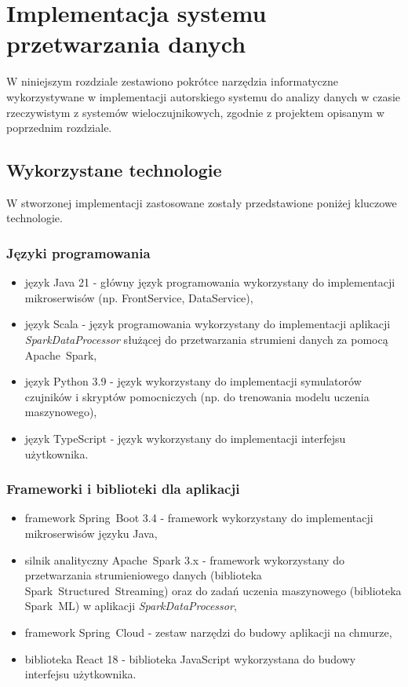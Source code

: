 \section{Implementacja systemu przetwarzania danych}
\label{sec:implementacja_systemu}

W niniejszym rozdziale zestawiono pokrótce narzędzia informatyczne wykorzystywane w implementacji autorskiego systemu do analizy danych w czasie rzeczywistym z systemów wieloczujnikowych,
zgodnie z projektem opisanym w poprzednim rozdziale.

\subsection{Wykorzystane technologie}
\label{subsec:technologie}

W stworzonej implementacji zastosowane zostały przedstawione poniżej kluczowe technologie.

\subsubsection{Języki programowania}
\label{subsubsec:jezyki_programowania}

\begin{itemize}
    \item język Java 21 - główny język programowania wykorzystany do implementacji mikroserwisów (np. FrontService, DataService),
    \item język Scala - język programowania wykorzystany do implementacji aplikacji \\ \textit{\mbox{SparkDataProcessor}} służącej do przetwarzania strumieni danych za pomocą \mbox{Apache Spark},
    \item język Python 3.9 - język wykorzystany do implementacji symulatorów czujników i skryptów pomocniczych (np. do trenowania modelu uczenia maszynowego),
    \item język TypeScript - język wykorzystany do implementacji interfejsu użytkownika.
\end{itemize}

\subsubsection{Frameworki i biblioteki dla aplikacji}
\label{subsubsec:frameworki}

\begin{itemize}
    \item framework \mbox{Spring Boot} 3.4 - framework wykorzystany do implementacji mikroserwisów języku Java,
    \item silnik analityczny \mbox{Apache Spark} 3.x \cite{spark_streaming} - framework wykorzystany do przetwarzania strumieniowego danych (biblioteka \mbox{Spark Structured Streaming}) \cite{chambers2018spark} oraz do zadań uczenia maszynowego (biblioteka \mbox{Spark ML}) w aplikacji \mbox{\textit{SparkDataProcessor}},
    \item framework \mbox{Spring Cloud} - zestaw narzędzi do budowy aplikacji na chmurze,
    \item biblioteka React 18 - biblioteka JavaScript wykorzystana do budowy interfejsu użytkownika.
\end{itemize}

